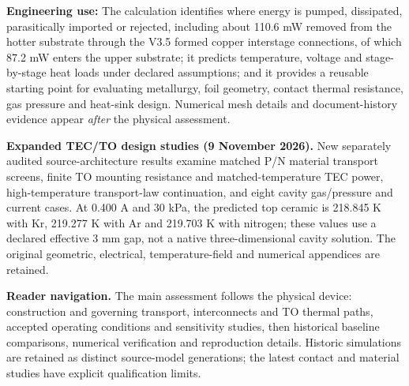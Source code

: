 \documentclass[10pt,a4paper]{article}
\begin{document}
\textbf{Engineering use:} The calculation identifies where energy is pumped, dissipated, parasitically imported or rejected, including about 110.6 mW removed from the hotter substrate through the V3.5 formed copper interstage connections, of which 87.2 mW enters the upper substrate; it predicts temperature, voltage and stage-by-stage heat loads under declared assumptions; and it provides a reusable starting point for evaluating metallurgy, foil geometry, contact thermal resistance, gas pressure and heat-sink design. Numerical mesh details and document-history evidence appear \emph{after} the physical assessment.
\clearpage
\vspace{2mm}\par\textbf{Expanded TEC/TO design studies (9 November 2026).} New separately audited source-architecture results examine matched P/N material transport screens, finite TO mounting resistance and matched-temperature TEC power, high-temperature transport-law continuation, and eight cavity gas/pressure and current cases. At 0.400 A and 30 kPa, the predicted top ceramic is 218.845 K with Kr, 219.277 K with Ar and 219.703 K with nitrogen; these values use a declared effective 3 mm gap, not a native three-dimensional cavity solution. The original geometric, electrical, temperature-field and numerical appendices are retained.\par
\begingroup\small\setlength{\parskip}{0pt}\tableofcontents\endgroup\clearpage

\noindent\textbf{Reader navigation.} The main assessment follows the physical device: construction and governing transport, interconnects and TO thermal paths, accepted operating conditions and sensitivity studies, then historical baseline comparisons, numerical verification and reproduction details. Historic simulations are retained as distinct source-model generations; the latest contact and material studies have explicit qualification limits.\par\medskip
\end{document}
